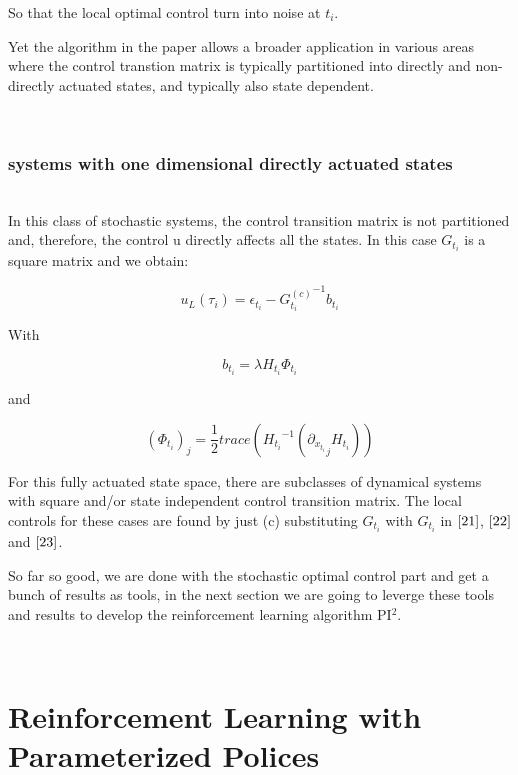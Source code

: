 \documentclass[journal]{IEEEtran}
\begin{document}
So that the local optimal control turn into noise at $t_i$.

Yet the algorithm in the paper allows a broader application in various areas where the control transtion matrix is typically partitioned into directly and non-directly actuated states,
and typically also state dependent.

\ \\
\subsubsection{systems with one dimensional directly actuated states}
\ \\
In this class of stochastic systems, the control transition matrix is not partitioned and, therefore, the
control u directly affects all the states. In this case $G_{t_i}$ is a square matrix and we obtain:

\begin{equation}
  u_L(\tau_i) = \epsilon_{t_i} - {G_{t_i}^{(c)}}^{-1} b_{t_i}
\end{equation}

With 

\begin{equation}
  b_{t_i} = \lambda H_{t_i} \Phi_{t_i} \nonumber 
 \end{equation}

and


\begin{equation}
 (\Phi_{t_i})_j =  \frac{1}{2} trace ({H_{t_i}}^{-1}({\partial_{x_{t_i}}}_j H_{t_i} ) )\nonumber 
\end{equation}
 
 For this fully actuated state space, there are subclasses of dynamical systems with square and/or state independent control transition matrix. The local controls for these cases are found by just
 (c) substituting $G_{t_i}$ with $G_{t_i}$ in $\ref{21}$, $\ref{22}$ and $\ref{23}$.
 
 So far so good, we are done with the stochastic optimal control part and get a bunch of results as tools, in the next section we are going to leverge these tools and results to develop the reinforcement 
 learning algorithm PI$^2$.


\ \\
\section{Reinforcement Learning with Parameterized Polices}
\ \\
\end{document}
